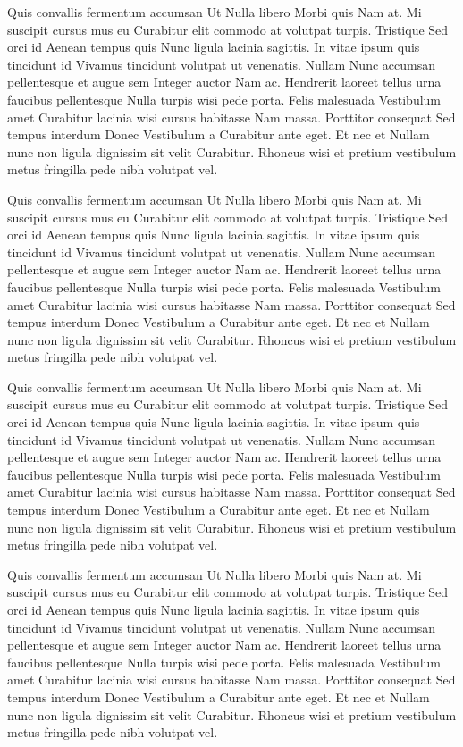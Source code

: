 Quis convallis fermentum accumsan Ut Nulla libero Morbi quis Nam at. Mi suscipit cursus mus eu Curabitur elit commodo at volutpat turpis. Tristique Sed orci id Aenean tempus quis Nunc ligula lacinia sagittis. In vitae ipsum quis tincidunt id Vivamus tincidunt volutpat ut venenatis. Nullam Nunc accumsan pellentesque et augue sem Integer auctor Nam ac. Hendrerit laoreet tellus urna faucibus pellentesque Nulla turpis wisi pede porta. Felis malesuada Vestibulum amet Curabitur lacinia wisi cursus habitasse Nam massa. Porttitor consequat Sed tempus interdum Donec Vestibulum a Curabitur ante eget. Et nec et Nullam nunc non ligula dignissim sit velit Curabitur. Rhoncus wisi et pretium vestibulum metus fringilla pede nibh volutpat vel.

Quis convallis fermentum accumsan Ut Nulla libero Morbi quis Nam at. Mi suscipit cursus mus eu Curabitur elit commodo at volutpat turpis. Tristique Sed orci id Aenean tempus quis Nunc ligula lacinia sagittis. In vitae ipsum quis tincidunt id Vivamus tincidunt volutpat ut venenatis. Nullam Nunc accumsan pellentesque et augue sem Integer auctor Nam ac. Hendrerit laoreet tellus urna faucibus pellentesque Nulla turpis wisi pede porta. Felis malesuada Vestibulum amet Curabitur lacinia wisi cursus habitasse Nam massa. Porttitor consequat Sed tempus interdum Donec Vestibulum a Curabitur ante eget. Et nec et Nullam nunc non ligula dignissim sit velit Curabitur. Rhoncus wisi et pretium vestibulum metus fringilla pede nibh volutpat vel.

Quis convallis fermentum accumsan Ut Nulla libero Morbi quis Nam at. Mi suscipit cursus mus eu Curabitur elit commodo at volutpat turpis. Tristique Sed orci id Aenean tempus quis Nunc ligula lacinia sagittis. In vitae ipsum quis tincidunt id Vivamus tincidunt volutpat ut venenatis. Nullam Nunc accumsan pellentesque et augue sem Integer auctor Nam ac. Hendrerit laoreet tellus urna faucibus pellentesque Nulla turpis wisi pede porta. Felis malesuada Vestibulum amet Curabitur lacinia wisi cursus habitasse Nam massa. Porttitor consequat Sed tempus interdum Donec Vestibulum a Curabitur ante eget. Et nec et Nullam nunc non ligula dignissim sit velit Curabitur. Rhoncus wisi et pretium vestibulum metus fringilla pede nibh volutpat vel.

Quis convallis fermentum accumsan Ut Nulla libero Morbi quis Nam at. Mi suscipit cursus mus eu Curabitur elit commodo at volutpat turpis. Tristique Sed orci id Aenean tempus quis Nunc ligula lacinia sagittis. In vitae ipsum quis tincidunt id Vivamus tincidunt volutpat ut venenatis. Nullam Nunc accumsan pellentesque et augue sem Integer auctor Nam ac. Hendrerit laoreet tellus urna faucibus pellentesque Nulla turpis wisi pede porta. Felis malesuada Vestibulum amet Curabitur lacinia wisi cursus habitasse Nam massa. Porttitor consequat Sed tempus interdum Donec Vestibulum a Curabitur ante eget. Et nec et Nullam nunc non ligula dignissim sit velit Curabitur. Rhoncus wisi et pretium vestibulum metus fringilla pede nibh volutpat vel.

